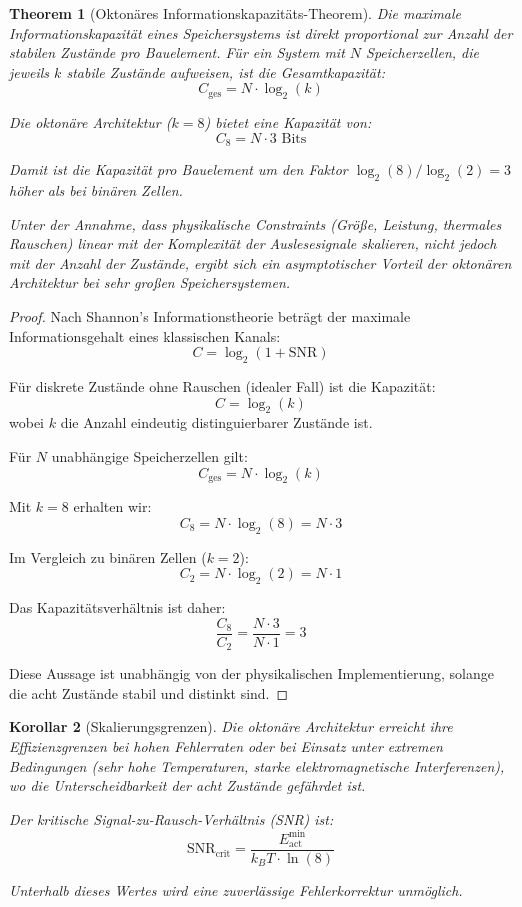 \documentclass[12pt, a4paper]{article}
\newtheorem{theorem}{Theorem}[section]
\newtheorem{corollary}[theorem]{Korollar}
\theoremstyle{definition}
\theoremstyle{remark}
\begin{document}
\begin{theorem}[Oktonäres Informationskapazitäts-Theorem]
\label{thm:oktonaeres_kapazitaets_theorem}
Die maximale Informationskapazität eines Speichersystems ist direkt proportional zur Anzahl der stabilen Zustände pro Bauelement. Für ein System mit $N$ Speicherzellen, die jeweils $k$ stabile Zustände aufweisen, ist die Gesamtkapazität:
\[
C_{\text{ges}} = N \cdot \log_2(k)
\]

Die oktonäre Architektur ($k=8$) bietet eine Kapazität von:
\[
C_8 = N \cdot 3 \text{ Bits}
\]

Damit ist die Kapazität pro Bauelement um den Faktor $\log_2(8) / \log_2(2) = 3$ höher als bei binären Zellen.

Unter der Annahme, dass physikalische Constraints (Größe, Leistung, thermales Rauschen) linear mit der Komplexität der Auslesesignale skalieren, nicht jedoch mit der Anzahl der Zustände, ergibt sich ein asymptotischer Vorteil der oktonären Architektur bei sehr großen Speichersystemen.
\end{theorem}

\begin{proof}
Nach Shannon's Informationstheorie beträgt der maximale Informationsgehalt eines klassischen Kanals:
\[
C = \log_2(1 + \text{SNR})
\]

Für diskrete Zustände ohne Rauschen (idealer Fall) ist die Kapazität:
\[
C = \log_2(k)
\]
wobei $k$ die Anzahl eindeutig distinguierbarer Zustände ist.

Für $N$ unabhängige Speicherzellen gilt:
\[
C_{\text{ges}} = N \cdot \log_2(k)
\]

Mit $k = 8$ erhalten wir:
\[
C_8 = N \cdot \log_2(8) = N \cdot 3
\]

Im Vergleich zu binären Zellen ($k=2$):
\[
C_2 = N \cdot \log_2(2) = N \cdot 1
\]

Das Kapazitätsverhältnis ist daher:
\[
\frac{C_8}{C_2} = \frac{N \cdot 3}{N \cdot 1} = 3
\]

Diese Aussage ist unabhängig von der physikalischen Implementierung, solange die acht Zustände stabil und distinkt sind.
\end{proof}

\begin{corollary}[Skalierungsgrenzen]
\label{cor:skalierungsgrenzen}
Die oktonäre Architektur erreicht ihre Effizienzgrenzen bei hohen Fehlerraten oder bei Einsatz unter extremen Bedingungen (sehr hohe Temperaturen, starke elektromagnetische Interferenzen), wo die Unterscheidbarkeit der acht Zustände gefährdet ist.

Der kritische Signal-zu-Rausch-Verhältnis (SNR) ist:
\[
\mathrm{SNR}_{\text{crit}} = \frac{E_{\text{act}}^{\text{min}}}{k_B T \cdot \ln(8)}
\]

Unterhalb dieses Wertes wird eine zuverlässige Fehlerkorrektur unmöglich.
\end{corollary}
\end{document}
